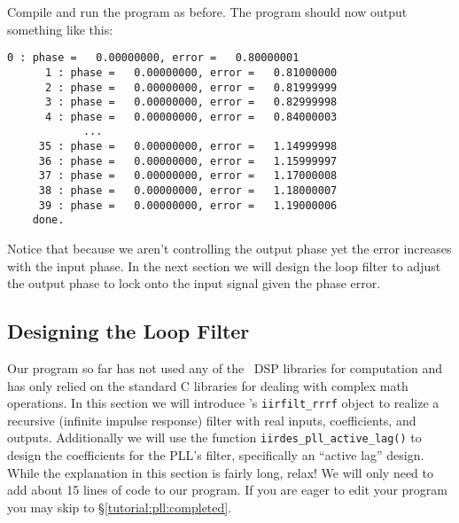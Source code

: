 %
Compile and run the program as before.
The program should now output something like this:
%
\begin{Verbatim}[fontsize=\small]
      0 : phase =   0.00000000, error =   0.80000001
      1 : phase =   0.00000000, error =   0.81000000
      2 : phase =   0.00000000, error =   0.81999999
      3 : phase =   0.00000000, error =   0.82999998
      4 : phase =   0.00000000, error =   0.84000003
            ...
     35 : phase =   0.00000000, error =   1.14999998
     36 : phase =   0.00000000, error =   1.15999997
     37 : phase =   0.00000000, error =   1.17000008
     38 : phase =   0.00000000, error =   1.18000007
     39 : phase =   0.00000000, error =   1.19000006
    done.
\end{Verbatim}
%
Notice that because we aren't controlling the output phase yet
the error increases with the input phase.
In the next section we will design the loop filter to adjust the output
phase to lock onto the input signal given the phase error.

\subsection{Designing the Loop Filter}
\label{tutorial:pll:design}

Our program so far has not used any of the \liquid\ DSP libraries for
computation and has only relied on the standard C libraries for dealing
with complex math operations.
In this section we will introduce \liquid's {\tt iirfilt\_rrrf} object
to realize a recursive (infinite impulse response) filter with real
inputs, coefficients, and outputs.
Additionally we will use the function {\tt iirdes\_pll\_active\_lag()}
to design the coefficients for the PLL's filter,
specifically an ``active lag'' design.
While the explanation in this section is fairly long, relax!
We will only need to add about 15 lines of code to our program.
If you are eager to edit your program you may skip to
\S\ref{tutorial:pll:completed}.

